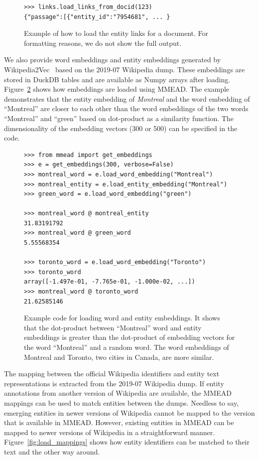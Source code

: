 \begin{figure}
\begin{verbatim}
>>> links.load_links_from_docid(123)
{"passage":[{"entity_id":"7954681", ... }
\end{verbatim}
	\caption{Example of how to load the entity links for a document. For formatting reasons, we do not show the full output. }
	\label{fig:load-links-for-document}
\end{figure}

We also provide word embeddings and entity embeddings generated by Wikipedia2Vec~\citep{wikipedia2vec} based on the 2019-07 Wikipedia dump. These embeddings are stored in DuckDB tables and are available as Numpy arrays after loading. Figure~\ref{fig:dot-product} shows how embeddings are loaded using MMEAD. The example demonstrates that the entity embedding of \emph{Montreal} and the word embedding of ``Montreal'' are closer to each other than the word embeddings of the two words ``Montreal'' and ``green'' based on dot-product as a similarity function. The dimensionality of the embedding vectors (300 or 500) can be specified in the code.

\begin{figure}
	\begin{verbatim}
>>> from mmead import get_embeddings
>>> e = get_embeddings(300, verbose=False)
>>> montreal_word = e.load_word_embedding("Montreal")
>>> montreal_entity = e.load_entity_embedding("Montreal")
>>> green_word = e.load_word_embedding("green")

>>> montreal_word @ montreal_entity
31.83191792
>>> montreal_word @ green_word
5.55568354

>>> toronto_word = e.load_word_embedding("Toronto")
>>> toronto_word
array([-1.497e-01, -7.765e-01, -1.000e-02, ...])
>>> montreal_word @ toronto_word
21.62585146
	\end{verbatim}
	\caption{Example code for loading word and entity embeddings. It shows that the dot-product between ``Montreal'' word and entity embeddings is greater than the dot-product of embedding vectors for the word ``Montreal'' and a random word. The word embeddings of Montreal and Toronto, two cities in Canada, are more similar.}
	\label{fig:dot-product}
\end{figure}

The mapping between the official Wikipedia identifiers and entity text representations is extracted from the 2019-07 Wikipedia dump. If entity annotations from another version of Wikipedia are available, the MMEAD mappings can be used to match entities between the dumps. 
Needless to say, emerging entities in newer versions of Wikipedia cannot be mapped to the version that is available in MMEAD. However, existing entities in MMEAD can be mapped to newer versions of Wikipedia in a straightforward manner.
Figure~\ref{fig:load_mappings} shows how entity identifiers can be matched to their text and the other way around.  

